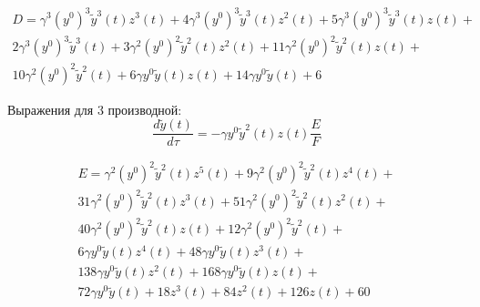 \documentclass[12pt, letterpaper]{article}
\begin{document}
\begin{equation}
	\begin{aligned}
		D = \gamma^{3} \left(y^{0}\right)^{3} \tilde{y}^{3}{\left(t \right)} z^{3}{\left(t \right)} + 4 \gamma^{3} \left(y^{0}\right)^{3} \tilde{y}^{3}{\left(t \right)} z^{2}{\left(t \right)} + 5 \gamma^{3} \left(y^{0}\right)^{3} \tilde{y}^{3}{\left(t \right)} z{\left(t \right)} + \\
		2 \gamma^{3} \left(y^{0}\right)^{3} \tilde{y}^{3}{\left(t \right)} + 3 \gamma^{2} \left(y^{0}\right)^{2} \tilde{y}^{2}{\left(t \right)} z^{2}{\left(t \right)} + 11 \gamma^{2} \left(y^{0}\right)^{2} \tilde{y}^{2}{\left(t \right)} z{\left(t \right)} + \\
		10 \gamma^{2} \left(y^{0}\right)^{2} \tilde{y}^{2}{\left(t \right)} + 6 \gamma y^{0} \tilde{y}{\left(t \right)} z{\left(t \right)} + 14 \gamma y^{0} \tilde{y}{\left(t \right)} + 6
	\end{aligned}
\end{equation}

Выражения для 3 производной:
\begin{equation}
	\frac{d \tilde{y}(t)}{d \tau} = - \gamma y^{0} \tilde{y}^{2}(t) z(t) \frac{E}{F}
\end{equation}

\begin{equation}
	\begin{aligned}
		E = \gamma^{2} \left(y^{0}\right)^{2} \tilde{y}^{2}{\left(t \right)} z^{5}{\left(t \right)} + 9 \gamma^{2} \left(y^{0}\right)^{2} \tilde{y}^{2}{\left(t \right)} z^{4}{\left(t \right)} + \\
		31 \gamma^{2} \left(y^{0}\right)^{2} \tilde{y}^{2}{\left(t \right)} z^{3}{\left(t \right)} + 51 \gamma^{2} \left(y^{0}\right)^{2} \tilde{y}^{2}{\left(t \right)} z^{2}{\left(t \right)} + \\
		40 \gamma^{2} \left(y^{0}\right)^{2} \tilde{y}^{2}{\left(t \right)} z{\left(t \right)} + 12 \gamma^{2} \left(y^{0}\right)^{2} \tilde{y}^{2}{\left(t \right)} + \\
		6 \gamma y^{0} \tilde{y}{\left(t \right)} z^{4}{\left(t \right)} + 48 \gamma y^{0} \tilde{y}{\left(t \right)} z^{3}{\left(t \right)} + \\
		138 \gamma y^{0} \tilde{y}{\left(t \right)} z^{2}{\left(t \right)} + 168 \gamma y^{0} \tilde{y}{\left(t \right)} z{\left(t \right)} + \\
		72 \gamma y^{0} \tilde{y}{\left(t \right)} + 18 z^{3}{\left(t \right)} + 84 z^{2}{\left(t \right)} + 126 z{\left(t \right)} + 60
	\end{aligned}
\end{equation}
\end{document}
